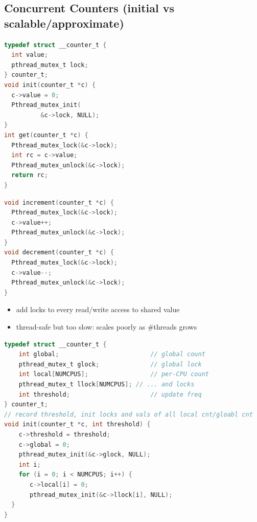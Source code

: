 \documentclass[8pt,a4paper,landscape]{extarticle}
\begin{document}
\pagestyle{empty}

\begin{multicols*}{3}
% 
% 
% 
% 

% 
% 
% 
% 
% 
% 
% 
% 
\section*{Concurrent Counters (initial vs scalable/approximate)}
\begin{minipage}{.5\linewidth}
\begin{lstlisting}[language=c,xrightmargin=4pt]
typedef struct __counter_t {
  int value;
  pthread_mutex_t lock;
} counter_t;
void init(counter_t *c) {
  c->value = 0;
  Pthread_mutex_init(
          &c->lock, NULL);
}
int get(counter_t *c) {
  Pthread_mutex_lock(&c->lock);
  int rc = c->value;
  Pthread_mutex_unlock(&c->lock);
  return rc;
}
\end{lstlisting}
\end{minipage}
\begin{minipage}{.5\linewidth}
\begin{lstlisting}[language=c,xleftmargin=4pt,framextopmargin=2pt]
void increment(counter_t *c) {
  Pthread_mutex_lock(&c->lock);
  c->value++;
  Pthread_mutex_unlock(&c->lock);
}
void decrement(counter_t *c) {
  Pthread_mutex_lock(&c->lock);
  c->value--;
  Pthread_mutex_unlock(&c->lock);
}
\end{lstlisting}
  \begin{itemize}
  \item add locks to every read/write access to shared value
  \item thread-safe but too slow: scales poorly as \#threads grows
  \end{itemize}
\end{minipage}
\begin{lstlisting}[language=c]
typedef struct __counter_t {
    int global;                         // global count
    pthread_mutex_t glock;              // global lock
    int local[NUMCPUS];                 // per-CPU count
    pthread_mutex_t llock[NUMCPUS]; // ... and locks
    int threshold;                      // update freq
} counter_t;
// record threshold, init locks and vals of all local cnt/gloabl cnt
void init(counter_t *c, int threshold) {
    c->threshold = threshold;
    c->global = 0;
    pthread_mutex_init(&c->glock, NULL);
    int i;
    for (i = 0; i < NUMCPUS; i++) {
       c->local[i] = 0;
       pthread_mutex_init(&c->llock[i], NULL);
  }
}


\end{lstlisting}
\end{multicols*}
\end{document}
